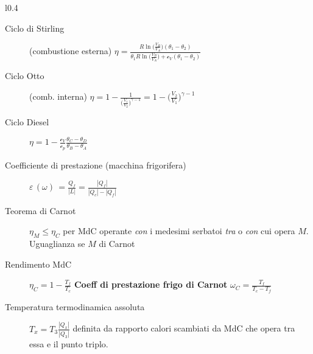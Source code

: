 \documentclass[10pt, oneside]{article}
\begin{document}
\begin{wrapfigure}{l}{0.4\textwidth}
\vspace{-5.5cm}
\end{wrapfigure}
\noindent 
\begin{description}
\item[Ciclo di Stirling] (combustione esterna) $\displaystyle \eta = \frac{R \ln \bigg(\displaystyle \frac{V_B}{V_A}\bigg) (\theta_1 - \theta_2)}{\displaystyle \theta_1 R\ln \bigg(\frac{V_B}{V_A}\bigg) + \mathcal{c}_V(\theta_1 - \theta_2)}$
\item[Ciclo Otto] (comb. interna) $\displaystyle \eta = 1 - \frac{1}{\bigg(\displaystyle \frac{V_1}{V_2}\bigg)^{\gamma -1}} = 1 - \bigg(\displaystyle \frac{V_2}{V_1}\bigg)^{\gamma -1}$
\item[Ciclo Diesel]
$\displaystyle \eta = 1 - \frac{\mathcal{c}_V}{\mathcal{c}_p} \frac{\theta_C - \theta_D}{\theta_B - \theta_A}$
\item[Coefficiente di prestazione (macchina frigorifera)] $\displaystyle \varepsilon \, (\omega) \, = \frac{Q_f}{|L|} = \frac{|Q_f|}{|Q_c| - |Q_f|}$
\item[Teorema di Carnot] $\eta_M \leq \eta_C$ per MdC operante \textit{con} i medesimi serbatoi \textit{tra} o \textit{con} cui opera $M$. Uguaglianza se $M$ di Carnot
\end{description}

\begin{description}
\item[Rendimento MdC] $\boxed{\displaystyle \eta_C = 1 - \frac{T_f}{T_c}}$ \textbf{Coeff di prestazione frigo di Carnot} $\boxed{\displaystyle \omega_C = \frac{T_f}{T_c - T_f}}$
\item[Temperatura termodinamica assoluta] $\displaystyle T_x = T_3 \frac{|Q_x|}{|Q_3|}$ definita da rapporto calori scambiati da MdC che opera tra essa e il punto triplo.
\end{description}
\end{document}
